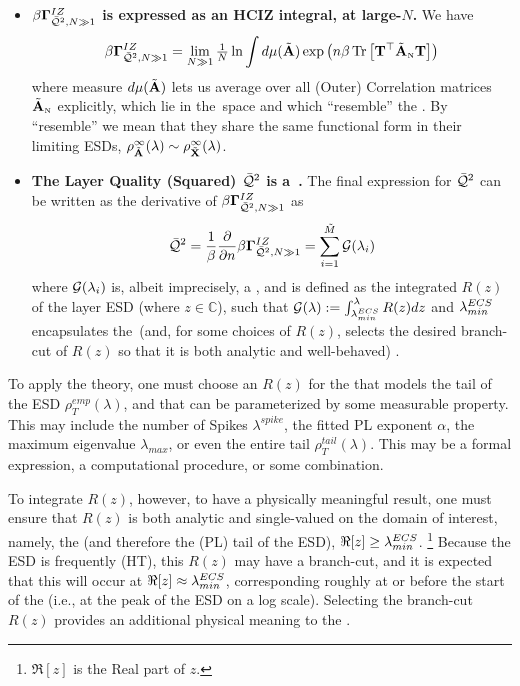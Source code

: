 \begin{itemize}
  \item
  \textbf{$\beta\mathbf{\Gamma}^{IZ}_{\bar{\mathcal{Q}}^{2},N\gg 1}$ is expressed as an HCIZ integral, at large-$N$.}
  We have
  \begin{align}
  \label{eqn:IZGINF_HCIZ}
  \IZGINF = \lim_{N\gg 1}\tfrac{1}{N}\ln\int d\mu(\AECS)\exp\left(\ND\beta\Trace{\TMAT^{\TR}\AECSN\TMAT}\right) %
  \end{align}
  where  measure $d\mu(\tilde{\mathbf{A}})$ lets us average over all (Outer) \Student Correlation matrices $\tilde{\mathbf{A}}_{\text{\tiny N}}$ explicitly, which
  lie in the~\ECS space and which ``resemble'' the \Teacher.
By ``resemble'' we mean that they share the same functional form in
  their limiting ESDs,
   $\rho^{\infty}_{\tilde{\mathbf{A}}}(\lambda)\sim\rho^{\infty}_{\tilde{\mathbf{X}}}(\lambda)$.
  \item
  \textbf{The Layer Quality (Squared) $\bar{\mathcal{Q}}^{2}$ is a~\GEN.}
  The final expression for $\bar{\mathcal{Q}}^{2}$ can be written as the derivative of $\beta\mathbf{\Gamma}^{IZ}_{\bar{\mathcal{Q}}^{2},N\gg 1}$  as
  \begin{align}
    \label{eqn:QT_result}
    \bar{\mathcal{Q}}^{2} = \dfrac{1}{\beta}\dfrac{\partial}{\partial n}\beta\mathbf{\Gamma}^{IZ}_{\bar{\mathcal{Q}}^{2},N\gg 1} = \sum_{i=1}^{\tilde{M}}\mathcal{G}(\lambda_{i})
  \end{align}
  where $\mathcal{G}(\lambda_{i})$ is, albeit imprecisely, a \emph{\GEN}, and is  defined as the integrated \emph{\RTransform} $R(z)$ of the \Teacher
  layer ESD (where $z\in\mathbb{C}$), such that $\mathcal{G(\lambda)}:= \int_{\lambda^{ECS}_{min}}^{\lambda}R(z)dz$
  and $\lambda^{ECS}_{min}$  encapsulates  the~\ECS (and, for some choices of $R(z)$,  selects the desired branch-cut of $R(z)$
  so that it is both analytic and well-behaved) .
\end{itemize}

To apply the theory, one must choose an \RTransform $R(z)$ for	the \Teacher that models 
the tail of the ESD $\rho^{emp}_{T}(\lambda)$, and that can be
parameterized by some measurable property.
This may include the number of Spikes $\lambda^{spike}$, the fitted PL exponent $\alpha$,
the maximum eigenvalue $\lambda_{max}$, or even the entire tail $\rho^{tail}_{T}(\lambda)$.
This may be a formal expression, a computational procedure, or some combination. 

To integrate $R(z)$, however, to have a physically meaningful result,
one must ensure that $R(z)$ is both
analytic and single-valued on the domain of interest, namely, the \ECS (and therefore
the (PL) tail of the ESD),  $\Re[z] \ge \lambda^{ECS}_{min}$.
\footnote{$\Re[z]$ is the Real part of $z$.}
Because the ESD is frequently \HeavyTailed (HT), this
\RTransform $R(z)$ may have a branch-cut, and it is expected that this will occur
at $\Re[z]\approx\lambda^{ECS}_{min}$, corresponding roughly at or before the start of the \ECS (i.e., at the peak of the ESD on a log scale).
Selecting the branch-cut $R(z)$ provides an additional physical meaning to the \ECS.

